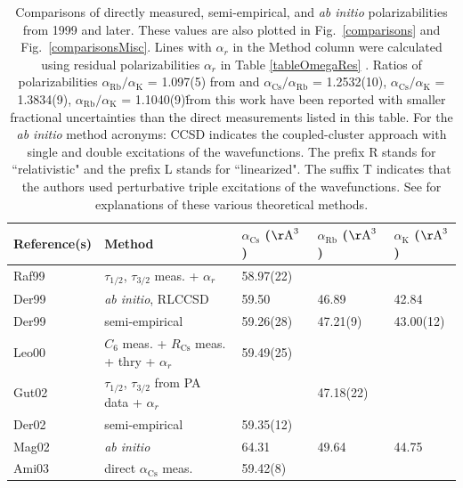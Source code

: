 \documentclass[twocolumn,pra,showpacs,superscriptaddress,longbibliography]{revtex4-1}   %
\newcommand{\figref}[1]{Fig.~\ref{#1}}
\newcommand{\ak}{\alpha_{\textrm{K}}}
\newcommand{\arb}{\alpha_{\textrm{Rb}}}
\newcommand{\acs}{\alpha_{\textrm{Cs}}}
\newcommand{\ratRbK}{1.1040(9)}
\newcommand{\ratCsK}{1.3834(9)}
\newcommand{\ratCsRb}{1.2532(10)}
\newcommand{\rcs}{R_{\mathrm{Cs}}}
\newcommand{\AAA}{\mathrm{\AA}}
\newcommand{\abinit}{\textit{ab initio}}
\newcommand{\abinitspace}{\textit{ab initio} }
\begin{document}
\begingroup
\begin{table}
\caption{\label{tableComparisons} Comparisons of directly measured, semi-empirical, and \abinitspace polarizabilities from 1999 and later. These values are also plotted in \figref{comparisons} and \figref{comparisonsMisc}.  Lines with $\alpha_r$ in the Method column were calculated using residual polarizabilities $\alpha_r$ in Table \ref{tableOmegaRes} \cite{Derevianko2001,Safronova2006}.  Ratios of polarizabilities $\arb/\ak$ = 1.097(5) from \cite{Holmgren2010} and $\acs/\arb$ = \ratCsRb, $\acs/\ak$ = \ratCsK, $\arb/\ak$ = \ratRbK \. from this work have been reported with smaller fractional uncertainties than the direct measurements listed in this table. For the \abinitspace method acronyms: CCSD indicates the coupled-cluster approach with single and double excitations of the wavefunctions. The prefix R stands for ``relativistic" and the prefix L stands for ``linearized". The suffix T indicates that the authors used perturbative triple excitations of the wavefunctions. See \cite{Mitroy2010} for explanations of these various theoretical methods.}
\begin{center}
\begin{tabular}{l l l l l}
\hline\hline
Reference(s) & Method & $\acs$ ($\AAA^3$) \,\,\,\,& $\arb$ ($\AAA^3$) \,\,\,\,& $\ak$ ($\AAA^3$) \\
\hline
Raf99 \cite{Rafac1999,Derevianko2001}  & $\tau_{1/2}$, $\tau_{3/2}$ meas. + $\alpha_r$& 58.97(22) &  &  \\
Der99 \cite{Derevianko1998} & \abinit, RLCCSD & 59.50 & 46.89 & 42.84 \\ %
Der99 \cite{Derevianko1998} & semi-empirical & 59.26(28) & 47.21(9) & 43.00(12) \\
Leo00 \cite{Leo2000,Rafac1998,Derevianko2001}  & $C_6$ meas. + $\rcs$ meas. + thry + $\alpha_r$ \,\,& 59.49(25) & & \\
Gut02 \cite{Gutterres2002,Gabbanini2000,Safronova2006} \,\, & $\tau_{1/2}$, $\tau_{3/2}$ from PA data + $\alpha_r$ & & 47.18(22) & \\
Der02 \cite{Derevianko2001} & semi-empirical & 59.35(12) & & \\
Mag02 \cite{Magnier2002} & \abinit & 64.31 & 49.64 & 44.75 \\
Ami03 \cite{Amini2003} & direct $\acs$ meas. & 59.42(8) & & \\

\end{tabular}
\end{center}
\end{table}
\end{document}
